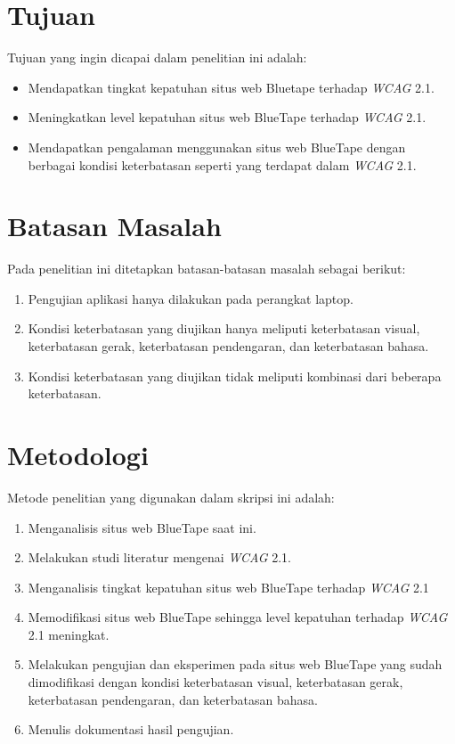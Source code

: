 \section{Tujuan}
\label{sec:tujuan}
Tujuan yang ingin dicapai dalam penelitian ini adalah:
\begin{itemize}
	\item Mendapatkan tingkat kepatuhan situs web Bluetape terhadap \textit{WCAG} 2.1.
	\item Meningkatkan level kepatuhan situs web BlueTape terhadap \textit{WCAG} 2.1.
	\item Mendapatkan pengalaman menggunakan situs web BlueTape dengan berbagai kondisi keterbatasan seperti yang terdapat dalam \textit{WCAG} 2.1.
\end{itemize}

\section{Batasan Masalah}
\label{sec:batasan}
Pada penelitian ini ditetapkan batasan-batasan masalah sebagai berikut:
\begin{enumerate}
	\item Pengujian aplikasi hanya dilakukan pada perangkat laptop.
	\item Kondisi keterbatasan yang diujikan hanya meliputi keterbatasan visual, keterbatasan gerak, keterbatasan pendengaran, dan keterbatasan bahasa.
	\item Kondisi keterbatasan yang diujikan tidak meliputi kombinasi dari beberapa keterbatasan.
\end{enumerate}

\section{Metodologi}
\label{sec:metlit}
Metode penelitian yang digunakan dalam skripsi ini adalah:
\begin{enumerate}
	\item Menganalisis situs web BlueTape saat ini. 
	\item Melakukan studi literatur mengenai \textit{WCAG} 2.1.
	\item Menganalisis tingkat kepatuhan situs web BlueTape terhadap \textit{WCAG} 2.1
	\item Memodifikasi situs web BlueTape sehingga level kepatuhan terhadap \textit{WCAG} 2.1 meningkat.
	\item Melakukan pengujian dan eksperimen pada situs web BlueTape yang sudah dimodifikasi dengan kondisi keterbatasan visual, keterbatasan gerak, keterbatasan pendengaran, dan keterbatasan bahasa.
	\item Menulis dokumentasi hasil pengujian.
\end{enumerate}

